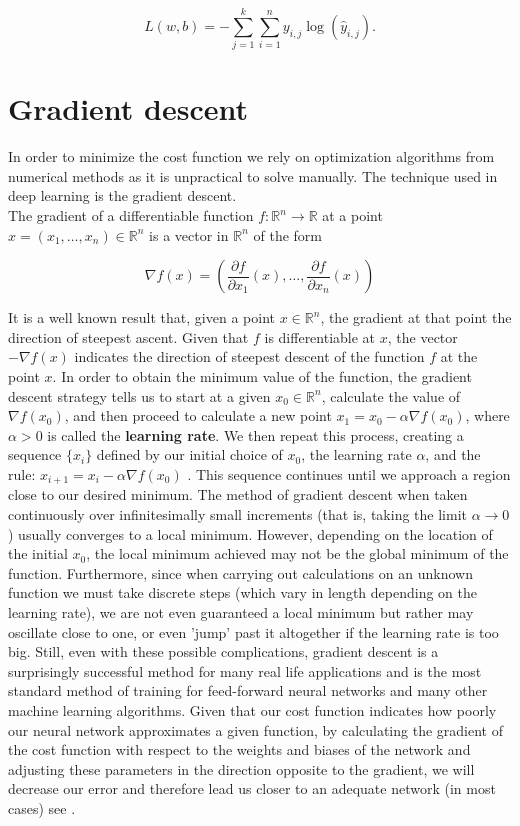 \begin{equation}
  \label{equ:m_likelihood}
  L(w, b) = - \sum_{j = 1}^k \sum_{i = 1}^{n} y_{i, j} \log(\hat{y}_{i, j}).
\end{equation}

\section{Gradient descent}
In order to minimize the cost function we rely on optimization algorithms from numerical methods as it is unpractical to solve manually. The technique used in deep learning is the gradient descent. \\
The gradient of a differentiable function $f: \mathbb{R}^n \longrightarrow \mathbb{R}$ at a point $x = (x_1, \ldots, x_n) \in \mathbb{R}^n$ is a vector in $\mathbb{R}^n$ of the form

\begin{equation}
  \label{equ:gradient}
  \nabla f(x) = (\frac{\partial f}{\partial x_1} (x), \ldots, \frac{\partial f}{\partial x_n} (x))
\end{equation}

It is a well known result that, given a point $x \in \mathbb{R}^n$, the gradient at that point the direction of steepest ascent. Given that $f$ is differentiable at $x$, the vector $-\nabla f(x)$ indicates the direction of steepest descent of the function $f$ at the point $x$.
In order to obtain the minimum value of the function, the gradient descent strategy tells us to start at a given $x_0 \in \mathbb{R}^n$, calculate the value of $\nabla f(x_0)$, and then proceed to calculate a new point $x_1 = x_0 − \alpha \nabla f(x_0)$, where $\alpha > 0$ is called the \textbf{learning rate}. We then repeat this process, creating a sequence $\{ x_i \}$ defined by our initial choice of $x_0$, the learning rate $\alpha$, and the rule: $x_{i + 1} = x_{i} − \alpha \nabla f(x_0)$  . This sequence continues until we approach a region close to our desired minimum.
The method of gradient descent when taken continuously over infinitesimally small increments (that is, taking the limit $\alpha \rightarrow 0$) usually converges to a local minimum. However, depending on the location of the initial $x_0$, the local minimum achieved may not be the global minimum of the function. Furthermore, since when carrying out calculations on an unknown function we must take discrete steps (which vary in length depending on the learning rate), we are not even guaranteed a local minimum but rather may oscillate close to one, or even ’jump’ past it altogether if the learning rate is too big. Still, even with these possible complications, gradient descent is a surprisingly successful method for many real life applications and is the most standard method of training for feed-forward neural networks and many other machine learning algorithms.
Given that our cost function indicates how poorly our neural network approximates a given function, by calculating the gradient of the cost function with respect to the weights and biases of the network and adjusting these parameters in the direction opposite to the gradient, we will decrease our error and therefore lead us closer to an adequate network (in most cases) see .

